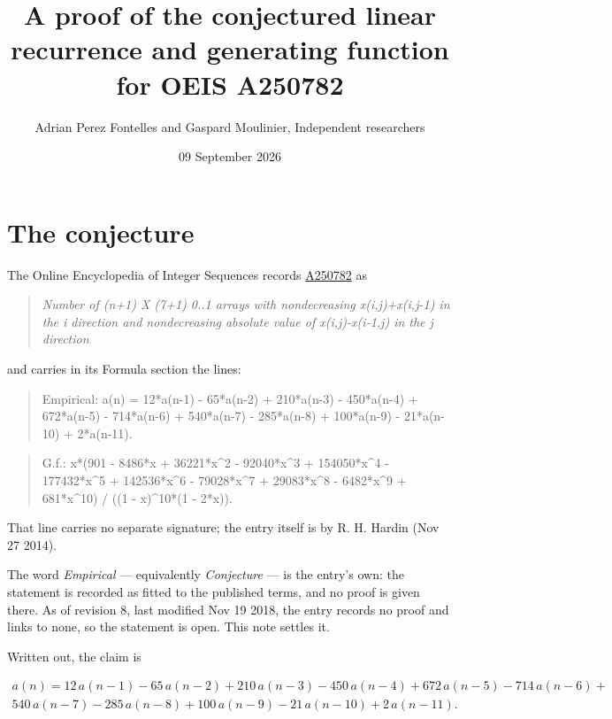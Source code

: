 \documentclass[11pt]{article}
\title{A proof of the conjectured linear recurrence and generating function for OEIS A250782}
\author{Adrian Perez Fontelles and Gaspard Moulinier, Independent researchers}
\date{09 September 2026}
\theoremstyle{definition}
\begin{document}
\maketitle
\section{The conjecture}

The Online Encyclopedia of Integer Sequences records \href{https://oeis.org/A250782}{A250782} as

\begin{quote}\itshape Number of (n+1) X (7+1) 0..1 arrays with nondecreasing x(i,j)+x(i,j-1) in the i direction and nondecreasing absolute value of x(i,j)-x(i-1,j) in the j direction\end{quote}

and carries in its Formula section the lines:

\begin{quote}\ttfamily Empirical: a(n) = 12*a(n-1) - 65*a(n-2) + 210*a(n-3) - 450*a(n-4) + 672*a(n-5) - 714*a(n-6) + 540*a(n-7) - 285*a(n-8) + 100*a(n-9) - 21*a(n-10) + 2*a(n-11).\end{quote}

\begin{quote}\ttfamily G.f.: x*(901 - 8486*x + 36221*x\textasciicircum{}2 - 92040*x\textasciicircum{}3 + 154050*x\textasciicircum{}4 - 177432*x\textasciicircum{}5 + 142536*x\textasciicircum{}6 - 79028*x\textasciicircum{}7 + 29083*x\textasciicircum{}8 - 6482*x\textasciicircum{}9 + 681*x\textasciicircum{}10) / ((1 - x)\textasciicircum{}10*(1 - 2*x)).\end{quote}

That line carries no separate signature; the entry itself is by R. H. Hardin (Nov 27 2014).

The word {\itshape Empirical} --- equivalently {\itshape Conjecture} --- is the entry's own: the statement is recorded as fitted to the published terms, and no proof is given there. As of revision 8, last modified Nov 19 2018, the entry records no proof and links to none, so the statement is open. This note settles it.

Written out, the claim is

\begin{multline*} a(n) = 12\,a(n-1) - 65\,a(n-2) + 210\,a(n-3) - 450\,a(n-4) + 672\,a(n-5) - 714\,a(n-6) + \\ 540\,a(n-7) - 285\,a(n-8) + 100\,a(n-9) - 21\,a(n-10) + 2\,a(n-11). \end{multline*}
\end{document}

